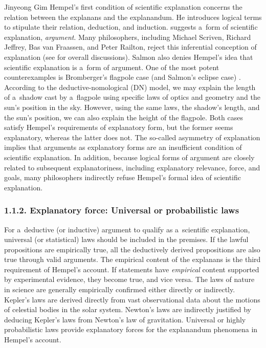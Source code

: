 \begin{artengenv}{Jinyeong Gim}
Hempel's first condition of scientific explanation concerns the relation between the explanans and the explanandum. He introduces logical terms to stipulate their relation, deduction, and induction.  
\parencite*[][pp.335–393]{hempel_aspects_1965} %
 suggests a~form of scientific explanation, \textit{argument}. Many philosophers, including Michael Scriven, Richard Jeffrey, Bas van Fraassen, and Peter Railton, reject this inferential conception of explanation
 (see \cite{salmon_four_1989} for overall discussions).
 Salmon also denies Hempel's idea that scientific explanation is a~form of argument. One of the most potent counterexamples is Bromberger's flagpole case (and Salmon's eclipse case)
\parencite[][pp.46–47]{salmon_four_1989}. %
According to the deductive-nomological (DN) model, we may explain the length of a~shadow cast by a~flagpole using specific laws of optics and geometry and the sun's position in the sky. However, using the same laws, the shadow's length, and the sun's position, we can also explain the height of the flagpole. Both cases satisfy Hempel's requirements of explanatory form, but the former seems explanatory, whereas the latter does not. The so-called asymmetry of explanation implies that arguments as explanatory forms are an insufficient condition of scientific explanation. In addition, because logical forms of argument are closely related to subsequent explanatoriness, including explanatory relevance, force, and goals, many philosophers indirectly refuse Hempel's formal idea of scientific explanation.

\subsubsection{1.1.2. Explanatory force: Universal or probabilistic laws}

For a~deductive (or inductive) argument to qualify as a~scientific explanation, universal (or statistical) laws should be included in the premises. If the lawful propositions are empirically true, all the deductively derived propositions are also true through valid arguments. The empirical content of the explanans is the third requirement of Hempel's account. If statements have \textit{empirical} content supported by experimental evidence, they become true, and vice versa. The laws of nature in science are generally empirically confirmed either directly or indirectly. Kepler's laws are derived directly from vast observational data about the motions of celestial bodies in the solar system. Newton's laws are indirectly justified by deducing Kepler's laws from Newton's law of gravitation. Universal or highly probabilistic laws provide explanatory forces for the explanandum phenomena in Hempel's account.


\end{artengenv}
